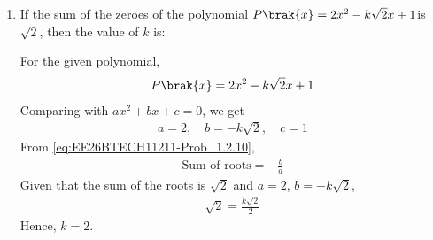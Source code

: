 \begin{enumerate}[label=\thesubsection.\arabic*, ref=\thesubsection.\theenumi]

\item
If the sum of the zeroes of the polynomial $P\brak{x} = 2x^2 - k\sqrt{2}x + 1$is $\sqrt{2}$, then the value of $k$ is:

\begin{enumerate}
\end{enumerate}

\solution

For the given polynomial,
\begin{align}
P\brak{x} = 2x^2 - k\sqrt{2}x + 1
\end{align}
Comparing with $ax^2 + bx + c = 0$, we get
\begin{align}
a = 2,\quad b = -k\sqrt{2},\quad c = 1
\end{align}
From \eqref{eq:EE26BTECH11211-Prob_1.2.10},
\begin{align}
\text{Sum of roots} = -\frac{b}{a}
\end{align}
Given that the sum of the roots is $\sqrt{2}$ and $a=2$, $b=-k\sqrt{2}$,
\begin{align}
\sqrt{2}=\frac{k\sqrt{2}}{2}
\end{align}
Hence, $k=2$.


\end{enumerate}
